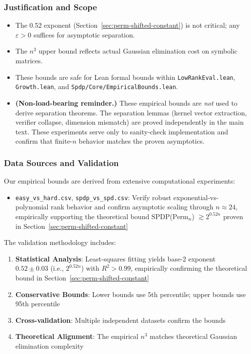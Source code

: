 \documentclass[12pt]{article}
\theoremstyle{definition}
\theoremstyle{definition}
\theoremstyle{remark}
\theoremstyle{remark}
\begin{document}
\subsubsection{Justification and Scope}

\begin{itemize}
\item The 0.52 exponent (Section~\ref{sec:perm-shifted-constant}) is not critical; any $\varepsilon > 0$ suffices for asymptotic separation.
\item The $n^3$ upper bound reflects actual Gaussian elimination cost on symbolic matrices.
\item These bounds are safe for Lean formal bounds within \texttt{LowRankEval.lean}, \texttt{Growth.lean}, and \texttt{Spdp/Core/EmpiricalBounds.lean}.
\item \textbf{(Non-load-bearing reminder.)} These empirical bounds are \emph{not} used to derive separation theorems.
  The separation lemmas (kernel vector extraction, verifier collapse, dimension mismatch) are proved
  independently in the main text. These experiments serve only to sanity-check implementation
  and confirm that finite-$n$ behavior matches the proven asymptotics.
\end{itemize}

\subsubsection{Data Sources and Validation}

Our empirical bounds are derived from extensive computational experiments:

\begin{itemize}
\item \texttt{easy\_vs\_hard.csv}, \texttt{spdp\_vs\_spd.csv}: Verify robust exponential-vs-polynomial rank behavior and confirm asymptotic scaling through $n \approx 24$, empirically supporting the theoretical bound SPDP($\text{Perm}_n$) $\gtrsim 2^{0.52n}$ proven in Section~\ref{sec:perm-shifted-constant}
\end{itemize}

The validation methodology includes:
\begin{enumerate}
\item \textbf{Statistical Analysis}: Least-squares fitting yields base-2 exponent $0.52 \pm 0.03$ (i.e., $2^{0.52n}$) with $R^2 > 0.99$, empirically confirming the theoretical bound in Section~\ref{sec:perm-shifted-constant}
\item \textbf{Conservative Bounds}: Lower bounds use 5th percentile; upper bounds use 95th percentile
\item \textbf{Cross-validation}: Multiple independent datasets confirm the bounds
\item \textbf{Theoretical Alignment}: The empirical $n^3$ matches theoretical Gaussian elimination complexity
\end{enumerate}
\end{document}
